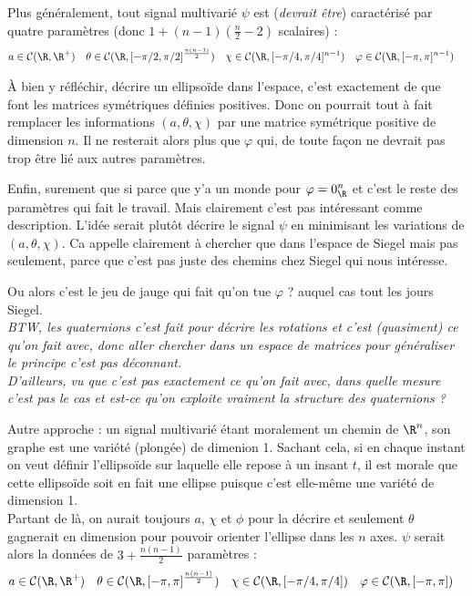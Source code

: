 \begin{proposition}\label{prop:gene_param_signal_v1}
Plus généralement, tout signal multivarié $\psi$ est (\textit{devrait être}) caractérisé par quatre paramètres (donc $1+(n-1)(\frac{n}{2}-2)$ scalaires) :
\begin{align*}
	a&\in\mathcal{C}(\R,\R^+)  &  \theta&\in\mathcal{C}(\R, [-\pi/2,\pi/2]^{\frac{n(n-1)}{2}})  &  \chi&\in\mathcal{C}(\R, [-\pi/4,\pi/4]^{n-1})  &  \varphi&\in\mathcal{C}(\R, [-\pi,\pi]^{n-1})
\end{align*}	
\end{proposition}

\`A bien y réfléchir, décrire un ellipsoïde dans l'espace, c'est exactement de que font les matrices symétriques définies positives. Donc on pourrait tout à fait remplacer les informations $(a,\theta,\chi)$ par une matrice symétrique positive de dimension $n$. Il ne resterait alors plus que $\varphi$ qui, de toute façon ne devrait pas trop être lié aux autres paramètres.

Enfin, surement que si parce que y'a un monde pour $\varphi=0_\R^n$ et c'est le reste des paramètres qui fait le travail. Mais clairement c'est pas intéressant comme description. L'idée serait plutôt décrire le signal $\psi$ en minimisant les variations de $(a,\theta,\chi)$.
Ca appelle clairement à chercher que dans l'espace de Siegel mais pas seulement, parce que c'est pas juste des chemins chez Siegel qui nous intéresse.

Ou alors c'est le jeu de jauge qui fait qu'on tue $\varphi$ ? auquel cas tout les jours Siegel.
\\

\textit{BTW, les quaternions c'est fait pour décrire les rotations et c'est (quasiment) ce qu'on fait avec, donc aller chercher dans un espace de matrices pour généraliser le principe c'est pas déconnant.}
\\
\textit{D'ailleurs, vu que c'est pas exactement ce qu'on fait avec, dans quelle mesure c'est pas le cas et est-ce qu'on exploite vraiment la structure des quaternions ?}


\begin{proposition}\label{prop:gene_param_signal_v2}
Autre approche : un signal multivarié étant moralement un chemin de $\R^n$, son graphe est une variété (plongée) de dimenion 1. Sachant cela, si en chaque instant on veut définir l'ellipsoïde sur laquelle elle repose à un insant $t$, il est morale que cette ellipsoïde soit en fait une ellipse puisque c'est elle-même une variété de dimension 1.
\\
Partant de là, on aurait toujours $a$, $\chi$ et $\phi$ pour la décrire et seulement $\theta$ gagnerait en dimension pour pouvoir orienter l'ellipse dans les $n$ axes. $\psi$ serait alors la données de $3+\frac{n(n-1)}{2}$ paramètres :
\begin{align*}
	a&\in\mathcal{C}(\R,\R^+)  &  \theta&\in\mathcal{C}(\R, [-\pi,\pi]^{\frac{n(n-1)}{2}})  &  \chi&\in\mathcal{C}(\R, [-\pi/4,\pi/4])  &  \varphi&\in\mathcal{C}(\R, [-\pi,\pi])
\end{align*}
\end{proposition}

